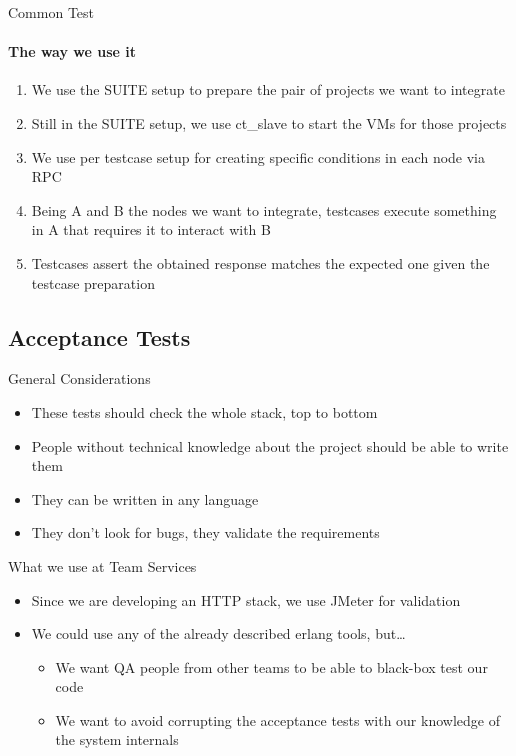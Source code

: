 \documentclass[aspectratio=169]{beamer}
\begin{document}
\begin{frame}{Common Test}
    \framesubtitle {The way we use it}
    \begin{enumerate}
    \pause
    \item We use the SUITE setup to prepare the pair of projects we want to integrate
    \pause
    \item Still in the SUITE setup, we use ct\_slave to start the VMs for those projects
    \pause
    \item We use per testcase setup for creating specific conditions in each node via RPC
    \pause
    \item Being A and B the nodes we want to integrate, testcases execute something in A that requires it to interact
    with B
    \pause
    \item Testcases assert the obtained response matches the expected one given the testcase preparation
    \end{enumerate}
\end{frame}

\subsection*{Acceptance Tests}
\label{acceptance_tests}

\begin{frame}{General Considerations}
    \begin{itemize}
    \pause
    \item These tests should check the whole stack, top to bottom
    \pause
    \item People without technical knowledge about the project should be able to write them
    \pause
    \item They can be written in any language
    \pause
    \item They don't look for bugs, they validate the requirements
    \end{itemize}
\end{frame}

\begin{frame}{What we use at Team Services}
    \begin{itemize}
    \item Since we are developing an HTTP stack, we use JMeter for validation
    \item We could use any of the already described erlang tools, but\dots
        \begin{itemize}
        \pause
        \item We want QA people from other teams to be able to black-box test our code
        \pause
        \item We want to avoid corrupting the acceptance tests with our knowledge of the system internals
        \end{itemize}
    \end{itemize}
\end{frame}
\end{document}
